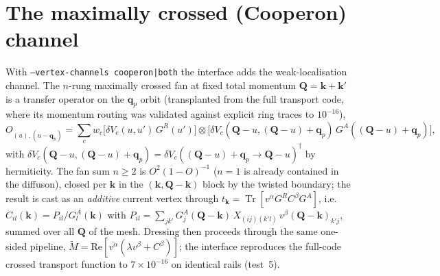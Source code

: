 \documentclass[11pt]{article}
\newcommand{\vk}{\mathbf{k}}
\newcommand{\vq}{\mathbf{q}}
\newcommand{\Tr}{\operatorname{Tr}}
\begin{document}
\section{The maximally crossed (Cooperon) channel}
\label{sec:cooperon}
With \texttt{--vertex-channels cooperon|both} the interface adds the
weak-localisation channel.  The $n$-rung maximally crossed fan at fixed
total momentum $\mathbf Q=\vk+\vk'$ is a transfer operator on the
$\vq_p$ orbit (transplanted from the full transport code, where its
momentum routing was validated against explicit ring traces to
$10^{-16}$),
\begin{equation}
O_{(u),(u-\vq_p)}=\sum_c w_c\big[\delta V_c(u,u')\,G^{R}(u')\big]
\otimes\big[\delta V_c(\mathbf Q{-}u,(\mathbf Q{-}u){+}\vq_p)\,
G^{A}((\mathbf Q{-}u){+}\vq_p)\big],
\end{equation}
with $\delta V_c(\mathbf Q{-}u,(\mathbf Q{-}u){+}\vq_p)
=\delta V_c((\mathbf Q{-}u){+}\vq_p\to\mathbf Q{-}u)^\dagger$ by
hermiticity.  The fan sum $n\ge2$ is $O^{2}(1-O)^{-1}$ ($n{=}1$ is
already contained in the diffuson), closed per $\vk$ in the
$(\vk,\mathbf Q{-}\vk)$ block by the twisted boundary; the result is
cast as an \emph{additive} current vertex through
$t_\vk=\Tr[v^{\alpha}G^{R}C^{\beta}G^{A}]$, i.e.\
$C_{il}(\vk)=P_{il}/G^{A}_{l}(\vk)$ with
$P_{il}=\sum_{jk'}G^{A}_{j}(\mathbf Q{-}\vk)\,X_{(ij)(k'l)}\,
v^{\beta}(\mathbf Q{-}\vk)_{k'j}$, summed over all $\mathbf Q$ of the
mesh.  Dressing then proceeds through the same one-sided pipeline,
$\tilde M=\mathrm{Re}[\overline{v^{\alpha}}(\lambda v^{\beta}
+C^{\beta})]$; the interface reproduces the full-code crossed transport
function to $7\times10^{-16}$ on identical rails (test~5).
\end{document}
